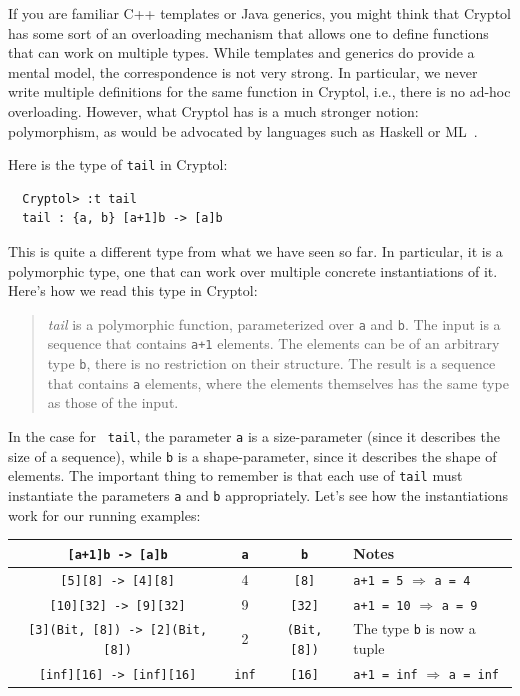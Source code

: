 If you are familiar C++ templates or Java generics, you might think
that Cryptol has some sort of an overloading mechanism that allows one
to define functions that can work on multiple types. While templates
and generics do provide a mental model, the correspondence is not very
strong. In particular, we never write multiple definitions for the
same function in Cryptol, i.e., there is no ad-hoc
overloading. However, what Cryptol has is a much stronger notion:
polymorphism, as would be advocated by languages such as Haskell or
ML~\cite{ML,Has98}.\indPolymorphism\indOverloading

Here is the type of {\tt tail} in Cryptol:
\begin{Verbatim}
  Cryptol> :t tail
  tail : {a, b} [a+1]b -> [a]b
\end{Verbatim}
This is quite a different type from what we have seen so far. In
particular, it is a polymorphic type, one that can work over multiple
concrete instantiations of it. Here's how we read this type in
Cryptol:
\begin{quote} {\em tail} is a polymorphic function, parameterized over
  {\tt a} and {\tt b}. The input is a sequence that contains {\tt a+1}
  elements.  The elements can be of an arbitrary type {\tt b}, there
  is no restriction on their structure. The result is a sequence that
  contains {\tt a} elements, where the elements themselves has the
  same type as those of the input.  \end{quote} In the case for {\tt
  tail}, the parameter {\tt a} is a size-parameter (since it describes
the size of a sequence), while {\tt b} is a shape-parameter, since it
describes the shape of elements.  The important thing to remember is
that each use of {\tt tail} must instantiate the parameters {\tt a}
and {\tt b} appropriately. Let's see how the instantiations work for
our running examples:


\begin{center}
\begin{adjustbox}{width={\textwidth},keepaspectratio}
\begin{tabular}[h]{c||c|c|l}
{\tt [a+1]b -> [a]b}                 & {\tt a}   & {\tt b}          & Notes \\ \hline\hline
{\tt [5][8] -> [4][8]}               &    4      & {\tt [8]}        & {\tt a+1 = 5} $\Rightarrow$ {\tt a = 4}  \\\hline
{\tt [10][32] -> [9][32]}            &    9      & {\tt [32]}       & {\tt a+1 = 10} $ \Rightarrow$ {\tt a = 9} \\\hline
{\tt [3](Bit, [8]) -> [2](Bit, [8])} &    2      & {\tt (Bit, [8])} & The type {\tt b} is now a tuple	           \\\hline
{\tt [inf][16] -> [inf][16]}         & {\tt inf} & {\tt [16]}       & {\tt a+1 = inf} $\Rightarrow$ {\tt a = inf}
\end{tabular}
\end{adjustbox}
\end{center}


